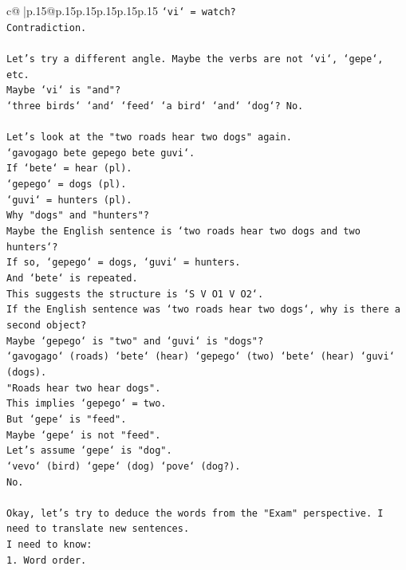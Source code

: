 \documentclass{article}
\begin{document}
{\begin{supertabular}{c@{$\;$}|p{.15\linewidth}@{}p{.15\linewidth}p{.15\linewidth}p{.15\linewidth}p{.15\linewidth}p{.15\linewidth}}
{{{\texttt{`vi` = watch?} \\
\texttt{Contradiction.} \\
\\ 
\texttt{Let's try a different angle. Maybe the verbs are not `vi`, `gepe`, etc.} \\
\texttt{Maybe `vi` is "and"?} \\
\texttt{`three birds` `and` `feed` `a bird` `and` `dog`? No.} \\
\\ 
\texttt{Let's look at the "two roads hear two dogs" again.} \\
\texttt{`gavogago bete gepego bete guvi`.} \\
\texttt{If `bete` = hear (pl).} \\
\texttt{`gepego` = dogs (pl).} \\
\texttt{`guvi` = hunters (pl).} \\
\texttt{Why "dogs" and "hunters"?} \\
\texttt{Maybe the English sentence is `two roads hear two dogs and two hunters`?} \\
\texttt{If so, `gepego` = dogs, `guvi` = hunters.} \\
\texttt{And `bete` is repeated.} \\
\texttt{This suggests the structure is `S V O1 V O2`.} \\
\texttt{If the English sentence was `two roads hear two dogs`, why is there a second object?} \\
\texttt{Maybe `gepego` is "two" and `guvi` is "dogs"?} \\
\texttt{`gavogago` (roads) `bete` (hear) `gepego` (two) `bete` (hear) `guvi` (dogs).} \\
\texttt{"Roads hear two hear dogs".} \\
\texttt{This implies `gepego` = two.} \\
\texttt{But `gepe` is "feed".} \\
\texttt{Maybe `gepe` is not "feed".} \\
\texttt{Let's assume `gepe` is "dog".} \\
\texttt{`vevo` (bird) `gepe` (dog) `pove` (dog?).} \\
\texttt{No.} \\
\\ 
\texttt{Okay, let's try to deduce the words from the "Exam" perspective. I need to translate new sentences.} \\
\texttt{I need to know:} \\
\texttt{1. Word order.} \\
}}}
\end{supertabular}}
\end{document}
